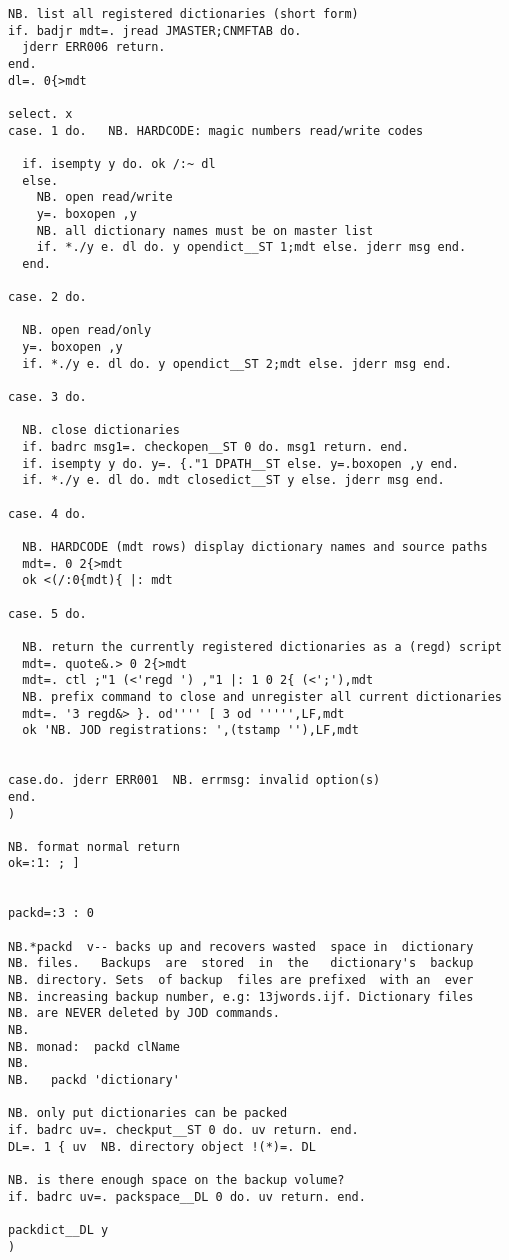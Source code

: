 \begin{lstlisting}[frame=single,framerule=0pt,basicstyle=\ttfamily\tiny]
NB. list all registered dictionaries (short form)
if. badjr mdt=. jread JMASTER;CNMFTAB do.
  jderr ERR006 return.
end.
dl=. 0{>mdt

select. x
case. 1 do.   NB. HARDCODE: magic numbers read/write codes

  if. isempty y do. ok /:~ dl
  else.
    NB. open read/write
    y=. boxopen ,y
    NB. all dictionary names must be on master list
    if. *./y e. dl do. y opendict__ST 1;mdt else. jderr msg end.
  end.

case. 2 do.

  NB. open read/only
  y=. boxopen ,y
  if. *./y e. dl do. y opendict__ST 2;mdt else. jderr msg end.

case. 3 do.

  NB. close dictionaries
  if. badrc msg1=. checkopen__ST 0 do. msg1 return. end.
  if. isempty y do. y=. {."1 DPATH__ST else. y=.boxopen ,y end.
  if. *./y e. dl do. mdt closedict__ST y else. jderr msg end.

case. 4 do.

  NB. HARDCODE (mdt rows) display dictionary names and source paths
  mdt=. 0 2{>mdt
  ok <(/:0{mdt){ |: mdt

case. 5 do. 

  NB. return the currently registered dictionaries as a (regd) script
  mdt=. quote&.> 0 2{>mdt
  mdt=. ctl ;"1 (<'regd ') ,"1 |: 1 0 2{ (<';'),mdt
  NB. prefix command to close and unregister all current dictionaries
  mdt=. '3 regd&> }. od'''' [ 3 od ''''',LF,mdt
  ok 'NB. JOD registrations: ',(tstamp ''),LF,mdt
  

case.do. jderr ERR001  NB. errmsg: invalid option(s)
end.
)

NB. format normal return
ok=:1: ; ]


packd=:3 : 0

NB.*packd  v-- backs up and recovers wasted  space in  dictionary
NB. files.   Backups  are  stored  in  the   dictionary's  backup
NB. directory. Sets  of backup  files are prefixed  with an  ever
NB. increasing backup number, e.g: 13jwords.ijf. Dictionary files
NB. are NEVER deleted by JOD commands.
NB.
NB. monad:  packd clName
NB.
NB.   packd 'dictionary'

NB. only put dictionaries can be packed
if. badrc uv=. checkput__ST 0 do. uv return. end.
DL=. 1 { uv  NB. directory object !(*)=. DL

NB. is there enough space on the backup volume?
if. badrc uv=. packspace__DL 0 do. uv return. end.

packdict__DL y
)


\end{lstlisting}
